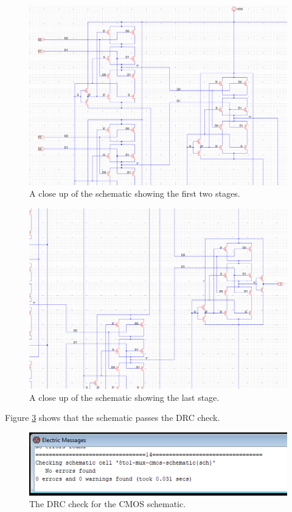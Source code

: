 \documentclass{article}
\begin{document}
    \begin{figure}[H]
      \centering
      \includegraphics[width=0.9\linewidth, frame]{screenshots/cmos/schem/schem2.png}
      \caption{A close up of the schematic showing the first two stages.}
      \label{fig:cmosschem2}
    \end{figure}

    \begin{figure}[H]
      \centering
      \includegraphics[width=0.9\linewidth, frame]{screenshots/cmos/schem/schem3.png}
      \caption{A close up of the schematic showing the last stage.}
      \label{fig:cmosschem3}
    \end{figure}

    Figure \ref{fig:cmosschemdrc} shows that the schematic passes the DRC check.


    \begin{figure}[H]
      \centering
      \includegraphics[width=0.6\linewidth, frame]{screenshots/cmos/schem/drc.png}
      \caption{The DRC check for the CMOS schematic.}
      \label{fig:cmosschemdrc}
    \end{figure}
\end{document}

